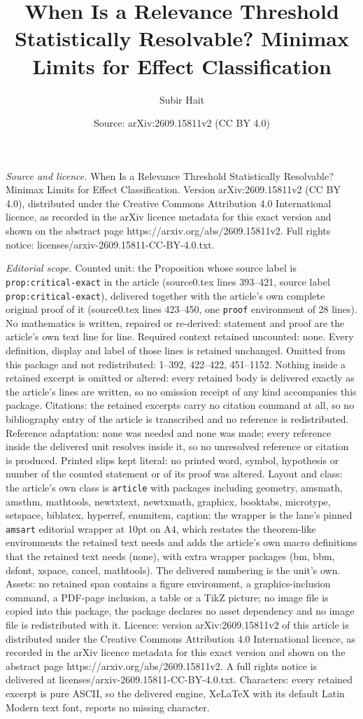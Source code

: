 \documentclass[10pt,a4paper]{amsart}
\title[When Is a Relevance Threshold Statistically Resolvable? Mini]{When Is a Relevance Threshold Statistically Resolvable? Minimax Limits for Effect Classification}
\author{Subir Hait}
\date{Source: arXiv:2609.15811v2 (CC BY 4.0)}
\begin{document}
\maketitle

\noindent\emph{Source and licence.} When Is a Relevance Threshold Statistically Resolvable? Minimax Limits for Effect Classification. Version arXiv:2609.15811v2 (CC BY 4.0), distributed under the Creative Commons Attribution 4.0 International licence, as recorded in the arXiv licence metadata for this exact version and shown on the abstract page https://arxiv.org/abs/2609.15811v2. Full rights notice: licenses/arxiv-2609.15811-CC-BY-4.0.txt.\par\smallskip

\noindent\textit{Editorial scope.} Counted unit: the Proposition whose source label is \texttt{prop:critical-exact} in the article (source0.tex lines 393--421, source label \texttt{prop:critical-exact}), delivered together with the article's own complete original proof of it (source0.tex lines 423--450, one \texttt{proof} environment of 28 lines). No mathematics is written, repaired or re-derived: statement and proof are the article's own text line for line. Required context retained uncounted: none. Every definition, display and label of those lines is retained unchanged. Omitted from this package and not redistributed: 1--392, 422--422, 451--1152. Nothing inside a retained excerpt is omitted or altered: every retained body is delivered exactly as the article's lines are written, so no omission receipt of any kind accompanies this package. Citations: the retained excerpts carry no citation command at all, so no bibliography entry of the article is transcribed and no reference is redistributed. Reference adaptation: none was needed and none was made; every reference inside the delivered unit resolves inside it, so no unresolved reference or citation is produced. Printed slips kept literal: no printed word, symbol, hypothesis or number of the counted statement or of its proof was altered. Layout and class: the article's own class is \texttt{article} with packages including geometry, amsmath, amsthm, mathtools, newtxtext, newtxmath, graphicx, booktabs, microtype, setspace, biblatex, hyperref, enumitem, caption; the wrapper is the lane's pinned \texttt{amsart} editorial wrapper at 10pt on A4, which restates the theorem-like environments the retained text needs and adds the article's own macro definitions that the retained text needs (none), with extra wrapper packages (bm, bbm, dsfont, xspace, cancel, mathtools). The delivered numbering is the unit's own. Assets: no retained span contains a figure environment, a graphics-inclusion command, a PDF-page inclusion, a table or a TikZ picture; no image file is copied into this package, the package declares no asset dependency and no image file is redistributed with it. Licence: version arXiv:2609.15811v2 of this article is distributed under the Creative Commons Attribution 4.0 International licence, as recorded in the arXiv licence metadata for this exact version and shown on the abstract page https://arxiv.org/abs/2609.15811v2. A full rights notice is delivered at licenses/arxiv-2609.15811-CC-BY-4.0.txt. Characters: every retained excerpt is pure ASCII, so the delivered engine, XeLaTeX with its default Latin Modern text font, reports no missing character.
\end{document}
